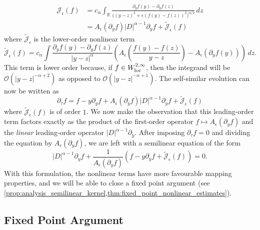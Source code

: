 \documentclass[11pt]{amsart}
\theoremstyle{definition}
\theoremstyle{remark}
\numberwithin{equation}{section}
\newcommand{\sq}[1]{\widetilde{#1}}
\newcommand{\R}{\mathbb{R}}
\newcommand{\mc}[1]{\mathcal{#1}}
\begin{document}
\begin{align*}
    \mc{J}_\epsilon(f) &= c_\alpha \int_{\R} \frac{\partial_y f(y) - \partial_y f(z)}{\big((y-z)^2+\epsilon(f(y)-f(z))^2\big)^{\alpha/2}}\,dz \\
    & = A_\epsilon(\partial_y f) |D|^{\alpha - 1} \partial_yf + \sq{\mc{J}}_\epsilon(f)
\end{align*}
where $\sq{\mc{J}}_\epsilon$ is the lower-order nonlinear term 
\[\sq{\mc{J}}_\epsilon(f) = c_\alpha \int \frac{\partial_y f(y) - \partial_y f(z)}{|y - z|^\alpha}\left(A_\epsilon\left(\frac{f(y) - f(z)}{y - z}\right) - A_\epsilon(\partial_y f(y))\right) \, dz.\]
This term is lower order because, if $f \in W^{2,\infty}_{\textup{loc}}$, then the integrand will be $\mc{O}(|y - z|^{-\alpha + 2})$ as opposed to $\mc{O}(|y - z|^{-\alpha + 1})$.  The self-similar evolution can now be written as
\begin{equation}\label{eqn:main_ideas_self_similar_front_equation_separated}
    \partial_\tau f = f - y\partial_yf + A_\epsilon(\partial_y f)|D|^{\alpha - 1} \partial_yf + \sq{\mc{J}}_\epsilon(f)
\end{equation}
where $\sq{\mc{J}}_\epsilon(f)$ is of order $1$. We now make the observation that this leading-order term factors exactly as the product of the first-order operator $f \mapsto A_\epsilon(\partial_y f)$ and the \emph{linear} leading-order operator $|D|^{\alpha - 1}\partial_y$. After imposing $\partial_\tau f = 0$ and dividing the equation by $A_\epsilon(\partial_y f)$, we are left with a semilinear equation of the form
\begin{equation}\label{eqn:main_ideas_self_similar_front_equation_semilinear}
    |D|^{\alpha - 1}\partial_y f + \frac{1}{A_\epsilon(\partial_y f)}\left(f - y\partial_yf + \sq{\mc{J}}_\epsilon(f)\right) = 0.
\end{equation}
With this formulation, the nonlinear terms have more favourable mapping properties, and we will be able to close a fixed point argument (see \cref{prop:analysis_semilinear_kernel,thm:fixed_point_nonlinear_estimates}). 

\subsection{Fixed Point Argument}
\end{document}
